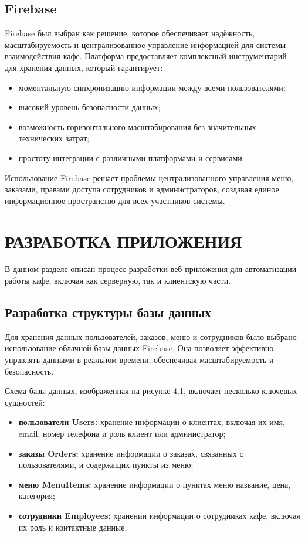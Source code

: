 {{        \subsection{Firebase}
        {
            Firebase был выбран как решение, которое обеспечивает надёжность, масштабируемость и централизованное управление информацией для системы взаимодействия кафе. Платформа предоставляет комплексный инструментарий для хранения данных, который гарантирует:
            \begin{itemize}
                \item моментальную синхронизацию информации между всеми пользователями;
                \item высокий уровень безопасности данных;
                \item возможность горизонтального масштабирования без значительных технических затрат;
                \item простоту интеграции с различными платформами и сервисами.
            \end{itemize}

            Использование Firebase решает проблемы централизованного управления меню, заказами, правами доступа сотрудников и администраторов, создавая единое информационное пространство для всех участников системы.
        }
    }


    \newpage
    \section{\MakeUppercase{Разработка приложения}}
    В данном разделе описан процесс разработки веб-приложения для автоматизации работы кафе, включая как серверную, так и клиентскую части.

    \subsection{Разработка структуры базы данных}
    {
        Для хранения данных пользователей, заказов, меню и сотрудников было выбрано использование облачной базы данных Firebase. Она позволяет эффективно управлять данными в реальном времени, обеспечивая масштабируемость и безопасность.
        
        Схема базы данных, изображенная на рисунке 4.1, включает несколько ключевых сущностей: 
        \begin{itemize}
            \item \textbf{пользователи Users:} хранение информации о клиентах, включая их имя, email, номер телефона и роль клиент или администратор;
            \item \textbf{заказы Orders:} хранение информации о заказах, связанных с пользователями, и содержащих пункты из меню;
            \item \textbf{меню MenuItems:} хранение информации о пунктах меню название, цена, категория;
            \item \textbf{сотрудники Employees:} хранении информации о сотрудниках кафе, включая их роль и контактные данные.
        \end{itemize}

}}
